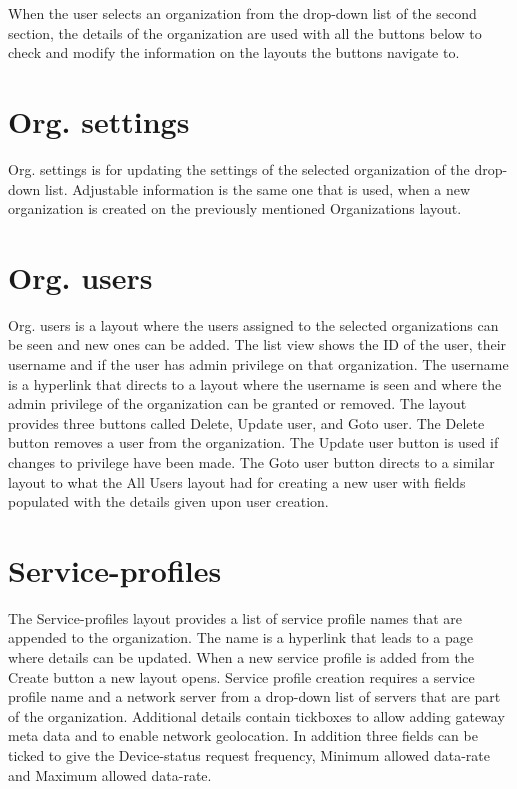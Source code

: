 When the user selects an organization from the drop-down list of the second section, the details of the organization are used with all the buttons below to check and modify the information on the layouts the buttons navigate to.

\section{Org. settings}
Org. settings is for updating the settings of the selected organization of the drop-down list.
Adjustable information is the same one that is used, when a new organization is created on the previously mentioned Organizations layout.

\section{Org. users}
Org. users is a layout where the users assigned to the selected organizations can be seen and new ones can be added.
The list view shows the ID of the user, their username and if the user has admin privilege on that organization.
The username is a hyperlink that directs to a layout where the username is seen and where the admin privilege of the organization can be granted or removed.
The layout provides three buttons called Delete, Update user, and Goto user.
The Delete button removes a user from the organization.
The Update user button is used if changes to privilege have been made.
The Goto user button directs to a similar layout to what the All Users layout had for creating a new user with fields populated with the details given upon user creation.
\clearpage

\section{Service-profiles}
The Service-profiles layout provides a list of service profile names that are appended to the organization.
The name is a hyperlink that leads to a page where details can be updated.
When a new service profile is added from the Create button a new layout opens.
Service profile creation requires a service profile name and a network server from a drop-down list of servers that are part of the organization.
Additional details contain tickboxes to allow adding gateway meta data and to enable network geolocation.
In addition three fields can be ticked to give the Device-status request frequency, Minimum allowed data-rate and Maximum allowed data-rate.

